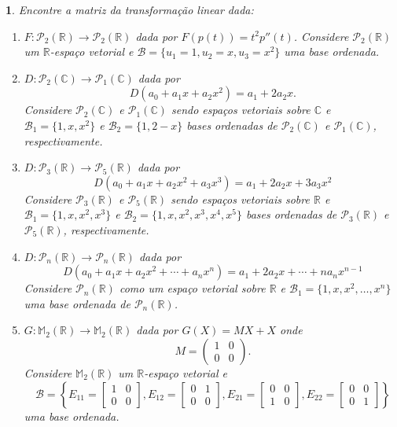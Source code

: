 \documentclass[12pt]{exam}
\newtheorem{exercicio}{}
\newcommand{\real}{\mathbb{R}}
\newcommand{\complex}{\mathbb{C}}
\newcommand{\cp}[1]{\mathbb{#1}}
\begin{document}
\begin{exercicio}
  Encontre a matriz da transforma\c{c}\~ao linear dada:
  \begin{enumerate}[label=({\alph*})]
    \item $F : \mathcal{P}_2(\real) \to \mathcal{P}_2(\real)$ dada por $F(p(t)) = t^2p''(t)$. Considere $\mathcal{P}_2(\real)$ um $\real$-espa\c{c}o vetorial e $\mathcal{B} = \{u_1 = 1, u_2 = x, u_3 = x^2\}$ uma base ordenada.
    
    \item $D : \mathcal{P}_2(\complex) \to \mathcal{P}_1(\complex)$ dada por
    \[
      D(a_0 + a_1x + a_2x^2) = a_1 + 2a_2x.
    \]
    Considere $\mathcal{P}_2(\complex)$ e $\mathcal{P}_1(\complex)$ sendo espa\c{c}os vetoriais sobre $\complex$ e $\mathcal{B}_1 = \{1, x, x^2\}$ e $\mathcal{B}_2 = \{1, 2 - x\}$ bases ordenadas de $\mathcal{P}_2(\complex)$ e $\mathcal{P}_1(\complex)$, respectivamente.
    
    \item $D : \mathcal{P}_3(\real) \to \mathcal{P}_5(\real)$ dada por
    \[
      D(a_0 + a_1x + a_2x^2 + a_3x^3) = a_1 + 2a_2x + 3a_3x^2
    \]
    Considere $\mathcal{P}_3(\real)$ e $\mathcal{P}_5(\real)$ sendo espa\c{c}os vetoriais sobre $\real$ e $\mathcal{B}_1 = \{1, x, x^2, x^3\}$ e $\mathcal{B}_2 = \{1, x, x^2, x^3, x^4, x^5\}$ bases ordenadas de $\mathcal{P}_3(\real)$ e $\mathcal{P}_5(\real)$, respectivamente.

    \item $D : \mathcal{P}_n(\real) \to \mathcal{P}_n(\real)$ dada por
    \[
      D(a_0 + a_1x + a_2x^2 + \cdots + a_nx^n) = a_1 + 2a_2x + \cdots + na_nx^{n-1}
    \]
    Considere $\mathcal{P}_n(\real)$ como um espa\c{c}o vetorial sobre $\real$ e $\mathcal{B}_1 = \{1, x, x^2, \dots, x^n\}$ uma base ordenada de $\mathcal{P}_n(\real)$.

    \item $G : \cp{M}_2(\real) \to \cp{M}_2(\real)$ dada por $G(X) = MX + X$ onde
    \[
      M = \begin{pmatrix}
        1 & 0\\
        0 & 0
      \end{pmatrix}.
    \]
    Considere $\cp{M}_2(\real)$ um $\real$-espa\c{c}o vetorial e
    \[
        \mathcal{B} = \left\{E_{11} = \begin{bmatrix}
          1 & 0\\0 & 0
        \end{bmatrix}, E_{12} = \begin{bmatrix}
          0 & 1\\0 & 0
        \end{bmatrix}, E_{21} = \begin{bmatrix}
          0 & 0\\1 & 0
        \end{bmatrix}, E_{22} = \begin{bmatrix}
          0 & 0\\0 & 1
        \end{bmatrix}\right\}
    \]
    uma base ordenada.


\end{enumerate}
\end{exercicio}
\end{document}
